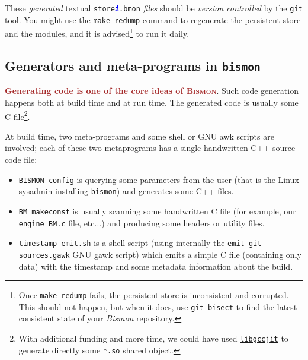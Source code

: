 \begin{appendices}
\begin{itemize}
\end{itemize}

These \emph{generated} textual
\texttt{store\textsection\textcolor{blue}{\textit{\textbf{i}}}.bmon} \emph{files}
should be \emph{version controlled} by the
\href{https://git-scm.com/}{\texttt{git}} tool. You might use the \texttt{make
  redump} command to regenerate the persistent store and the modules,
and it is advised\footnote{Once \texttt{make redump} fails, the
  persistent store is inconsistent and corrupted. This should not
  happen, but when it does, use
  \href{https://git-scm.com/docs/git-bisect}{\texttt{git bisect}} to
  find the latest consistent state of your \textit{Bismon} repository.}
to run it daily.
  
\subsection{Generators and meta-programs in \texttt{bismon}}

\textcolor{brown}{\textbf{Generating code is one of the core ideas of \textsc{Bismon}}}. Such code
generation happens both at build time and at run time. The generated
code is usually some C file\footnote{With additional funding and more
time, we could have used
\href{https://gcc.gnu.org/onlinedocs/jit/}{\texttt{libgccjit}} to
generate directly some \texttt{*.so} shared object.}.

At build time, two meta-programs and some shell or GNU awk scripts are involved; each of these two metaprograms has a
single handwritten C++ source code file:

\begin{itemize}
  \item \texttt{BISMON-config}
     is
    querying some parameters from the user (that is the Linux sysadmin
    installing \texttt{bismon}) and generates some C++ files.

  \item \texttt{BM\_makeconst}
     is usually
    scanning some handwritten C file (for example, our
    \texttt{engine\_BM.c} file, etc...)  and producing some headers or
    utility files.

  \item \texttt{timestamp-emit.sh} is a shell script
    (using internally the \texttt{emit-git-sources.gawk} GNU gawk
    script)
     which emits a simple C file
    (containing only data) with the timestamp and some metadata
    information about the build.
    

\end{itemize}
\end{appendices}
